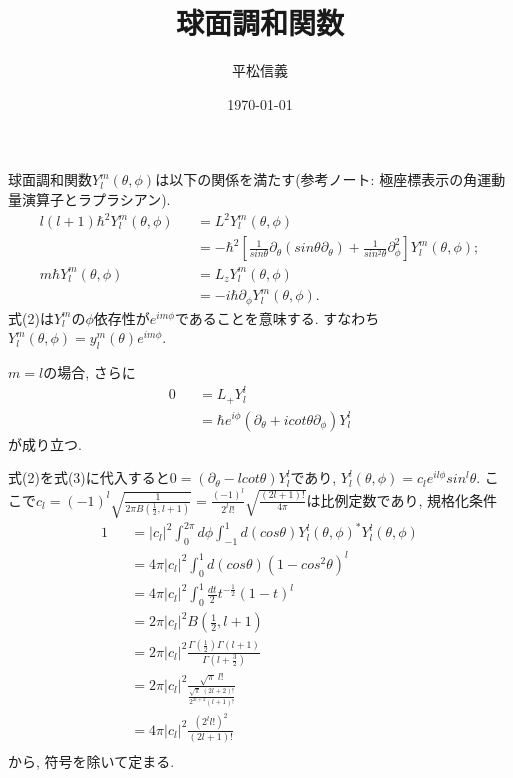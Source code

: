 \documentclass[11pt,a4paper]{jsarticle}
\title{球面調和関数}
\author{平松信義}
\date{\today}
\begin{document}
\maketitle

球面調和関数$Y_l^m(\theta,\phi)$は以下の関係を満たす(参考ノート: 極座標表示の角運動量演算子とラプラシアン). 
\begin{eqnarray}
 l(l+1)\hbar^2 Y_l^m(\theta,\phi)  &&= L^2 Y_l^m(\theta,\phi) \nonumber \\
 &&= -\hbar^2 [  \frac{1}{sin\theta }\partial_\theta  ( sin\theta  \partial_\theta) + \frac{1}{sin^2\theta } \partial_\phi^2  ] Y_l^m(\theta,\phi) ; \\
  m \hbar Y_l^m(\theta,\phi)  &&= L_z Y_l^m(\theta,\phi) \nonumber \\
 &&= -i\hbar \partial_\phi Y_l^m(\theta,\phi). 
\end{eqnarray}
式(2)は$Y_l^m$の$\phi$依存性が$e^{im\phi}$であることを意味する. すなわち$Y_l^m(\theta,\phi)=y_l^m(\theta)e^{im\phi}$. 

$m=l$の場合, さらに
\begin{eqnarray}
0 &&= L_+ Y_l^l \nonumber \\
&&= \hbar e^{i\phi} ( \partial_\theta  + i cot\theta  \partial_\phi)Y_l^l
\end{eqnarray}
が成り立つ. 

式(2)を式(3)に代入すると$0 =( \partial_\theta  - l cot\theta )Y_l^l$であり, $Y_l^l (\theta,\phi)= c_l e^{il\phi} sin^l \theta$. ここで$c_l=(-1)^l\sqrt{\frac{1}{2\pi B(\frac{1}{2}, l+1)}}=\frac{(-1)^l}{2^{l}l!} \sqrt{\frac{(2l+1)!}{4\pi}}$は比例定数であり, 規格化条件
\begin{eqnarray}
1 &&= |c_l|^2 \int_0^{2\pi}d\phi  \int_{-1}^{1} d(cos\theta) Y_l^l(\theta,\phi)^* Y_l^l(\theta,\phi)\nonumber \\
&&= 4\pi  |c_l|^2 \int_{0}^{1} d(cos\theta) (1-cos^2\theta)^l \nonumber \\
&&= 4\pi  |c_l|^2 \int_{0}^{1}  \frac{dt}{2}t^{-\frac{1}{2}} (1-t)^l \nonumber \\
&&= 2\pi  |c_l|^2 B(\frac{1}{2}, l+1) \nonumber \\
&&= 2\pi  |c_l|^2 \frac{\Gamma(\frac{1}{2})\Gamma(l+1)}{\Gamma(l+\frac{3}{2})} \nonumber \\
&&= 2\pi  |c_l|^2 \frac{\sqrt{\pi}\:l!}{\frac{\sqrt{\pi}\:(2l+2)!}{2^{2l+2}(l+1)!}} \nonumber \\
&&= 4\pi  |c_l|^2 \frac{(2^{l}l!)^2}{(2l+1)!} \nonumber \\
\end{eqnarray}
から, 符号を除いて定まる.  
\end{document}
